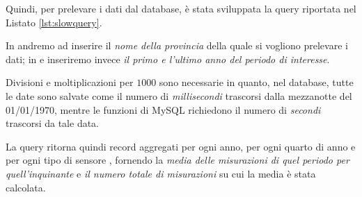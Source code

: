 Quindi, per prelevare i dati dal database, è stata sviluppata la query riportata
nel Listato \vref{lst:slowquery}.



In  andremo ad inserire il \emph{nome della
provincia} della quale si vogliono prelevare i dati; in
 e  inseriremo invece \emph{il
primo e l'ultimo anno del periodo di interesse}.

Divisioni e moltiplicazioni per \(1000\) sono necessarie in quanto, nel
database, tutte le date sono salvate come il numero di \emph{millisecondi}
trascorsi dalla mezzanotte del 01/01/1970, mentre le funzioni di MySQL
richiedono il numero di \emph{secondi} trascorsi da tale data.

La query ritorna quindi record aggregati per ogni anno, per ogni quarto di anno
e per ogni tipo di sensore , fornendo la \emph{media delle
misurazioni di quel periodo per quell'inquinante} e \emph{il numero totale di
misurazioni} su cui la media è stata calcolata.
